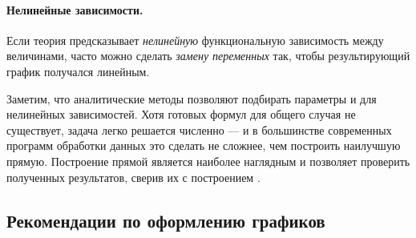 \paragraph{Нелинейные зависимости.}

Если теория предсказывает \emph{нелинейную} функциональную зависимость
между величинами, часто можно сделать \emph{замену переменных} так,
чтобы результирующий график получался линейным.

Заметим, что аналитические методы позволяют подбирать параметры и для нелинейных
зависимостей. Хотя готовых формул для общего случая не существует, задача
легко решается численно --- и в большинстве современных программ обработки
данных это сделать не сложнее, чем построить наилучшую прямую.
Построение прямой является наиболее наглядным и позволяет проверить
 полученных результатов, сверив их с построением
.





\subsection{Рекомендации по оформлению графиков}

